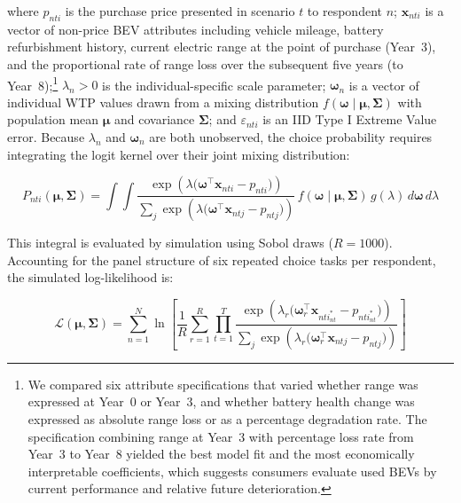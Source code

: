 \documentclass[a4paper,fleqn]{cas-sc}   %
\begin{document}
\noindent where $p_{nti}$ is the purchase price presented in scenario $t$ to respondent $n$; $\mathbf{x}_{nti}$ is a vector of non-price BEV attributes including vehicle mileage, battery refurbishment history, current electric range at the point of purchase (Year~3), and the proportional rate of range loss over the subsequent five years (to Year~8);\footnote{We compared six attribute specifications that varied whether range was expressed at Year~0 or Year~3, and whether battery health change was expressed as absolute range loss or as a percentage degradation rate. The specification combining range at Year~3 with percentage loss rate from Year~3 to Year~8 yielded the best model fit and the most economically interpretable coefficients, which suggests consumers evaluate used BEVs by current performance and relative future deterioration.} $\lambda_n > 0$ is the individual-specific scale parameter; $\boldsymbol{\omega}_n$ is a vector of individual WTP values drawn from a mixing distribution $f(\boldsymbol{\omega} \mid \boldsymbol{\mu}, \boldsymbol{\Sigma})$ with population mean $\boldsymbol{\mu}$ and covariance $\boldsymbol{\Sigma}$; and $\varepsilon_{nti}$ is an IID Type I Extreme Value error. Because $\lambda_n$ and $\boldsymbol{\omega}_n$ are both unobserved, the choice probability requires integrating the logit kernel over their joint mixing distribution:

\begin{equation}
    P_{nti}(\boldsymbol{\mu}, \boldsymbol{\Sigma}) = \int\!\int \frac{\exp\!\left(\lambda\bigl(\boldsymbol{\omega}^{\top}\mathbf{x}_{nti} - p_{nti}\bigr)\right)}{\displaystyle\sum_{j} \exp\!\left(\lambda\bigl(\boldsymbol{\omega}^{\top}\mathbf{x}_{ntj} - p_{ntj}\bigr)\right)} \, f(\boldsymbol{\omega} \mid \boldsymbol{\mu}, \boldsymbol{\Sigma})\, g(\lambda) \, d\boldsymbol{\omega}\, d\lambda
    \label{eq:mxl_prob}
\end{equation}

\noindent This integral is evaluated by simulation using Sobol draws ($R = 1000$). Accounting for the panel structure of six repeated choice tasks per respondent, the simulated log-likelihood is:

\begin{equation}
    \mathcal{L}(\boldsymbol{\mu}, \boldsymbol{\Sigma}) = \sum_{n=1}^{N} \ln \left[ \frac{1}{R} \sum_{r=1}^{R} \prod_{t=1}^{T} \frac{\exp\!\left(\lambda_r\bigl(\boldsymbol{\omega}_r^{\top}\mathbf{x}_{nti_{nt}^*} - p_{nti_{nt}^*}\bigr)\right)}{\displaystyle\sum_{j} \exp\!\left(\lambda_r\bigl(\boldsymbol{\omega}_r^{\top}\mathbf{x}_{ntj} - p_{ntj}\bigr)\right)} \right]
    \label{eq:mxl_ll}
\end{equation}
\end{document}
